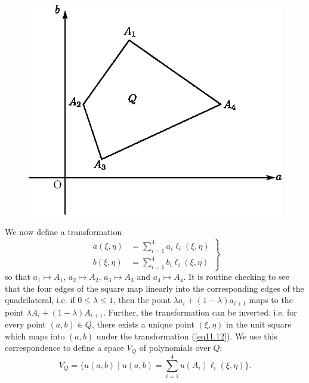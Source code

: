 \begin{figure}[H]
\centering
\includegraphics{figures/fig52-11.2.eps}
\caption{}\label{c11:fig11.2}
\end{figure}


We now define a transformation
\begin{equation*}
\left. 
\begin{aligned}
a(\xi, \eta) & = \sum\limits^4_{i=1} a_i \ell_i (\xi, \eta)\\
b(\xi, \eta) & = \sum\limits^4_{i=1} b_i \ell_i (\xi, \eta)
\end{aligned}
\right\}
\tag{11.12}\label{eq11.12}
\end{equation*}
so that $a_1 \mapsto A_1$, $a_2 \mapsto A_2$, $a_3 \mapsto A_3$ and
$a_4 \mapsto A_4$. It is routine checking to see that the four edges
of the square map linearly into the corresponding edges of the
quadrilateral, i.e. if $0 \leq \lambda \leq 1$, then the point $\lambda
a_i+(1-\lambda) a_{i+1} $ maps to the point $\lambda A_i + (1-\lambda)
A_{i+1}$. Further, the transformation can be inverted. i.e. for every
point $(a,b) \in Q$, there exists a unique point $(\xi, \eta)$ in the
unit square which maps into $(a,b)$ under the transformation
(\ref{eq11.12}). We use this correspondence to define a space $V_Q$ of
polynomials over $Q$: 
\begin{equation*}
V_Q = \{u (a,b) \mid u(a,b) = \sum\limits^4_{i=1} u(A_i) \ell_i
(\xi, \eta)\}. \tag{11.13}\label{eq11.13} 
\end{equation*}\pageoriginale

